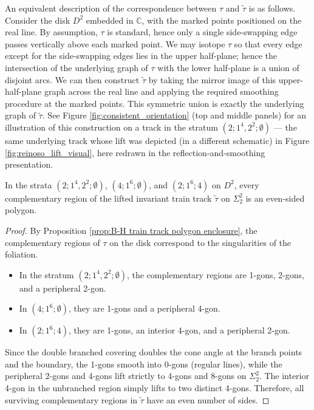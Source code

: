 An equivalent description of the correspondence between $\tau$ and $\tilde{\tau}$ is as follows. Consider the disk $D^2$ embedded in $\mathbb{C}$, with the marked points positioned on the real line. By assumption, $\tau$ is standard, hence only a single side-swapping edge passes vertically above each marked point. We may isotope $\tau$ so that every edge except for the side-swapping edges lies in the upper half-plane; hence the intersection of the underlying graph of $\tau$ with the lower half-plane is a union of disjoint arcs. We can then construct $\tilde{\tau}$ by taking the mirror image of this upper-half-plane graph across the real line and applying the required smoothing procedure at the marked points. This symmetric union is exactly the underlying graph of $\tilde{\tau}$. See Figure \ref{fig:consistent_orientation} (top and middle panels) for an illustration of this construction on a track in the stratum $(2; 1^4, 2^2; \emptyset)$ --- the same underlying track whose lift was depicted (in a different schematic) in Figure \ref{fig:reinoso_lift_visual}, here redrawn in the reflection-and-smoothing presentation.

\begin{lemma}
\label{lem:even_sided_polygons}
In the strata $(2; 1^4, 2^2; \emptyset)$, $(4; 1^6; \emptyset)$, and $(2; 1^6; 4)$ on $D^2$, every complementary region of the lifted invariant train track $\tilde{\tau}$ on $\Sigma_2^2$ is an even-sided polygon.
\end{lemma}

\begin{proof}
By Proposition \ref{prop:B-H train track polygon enclosure}, the complementary regions of $\tau$ on the disk correspond to the singularities of the foliation.
\begin{itemize}
    \item In the stratum $(2; 1^4, 2^2; \emptyset)$, the complementary regions are 1-gons, 2-gons, and a peripheral 2-gon.
    \item In $(4; 1^6; \emptyset)$, they are 1-gons and a peripheral 4-gon.
    \item In $(2; 1^6; 4)$, they are 1-gons, an interior 4-gon, and a peripheral 2-gon.
\end{itemize}
Since the double branched covering doubles the cone angle at the branch points and the boundary, the 1-gons smooth into 0-gons (regular lines), while the peripheral 2-gons and 4-gons lift strictly to 4-gons and 8-gons on $\Sigma_2^2$. The interior 4-gon in the unbranched region simply lifts to two distinct 4-gons. Therefore, all surviving complementary regions in $\tilde{\tau}$ have an even number of sides.
\end{proof}

